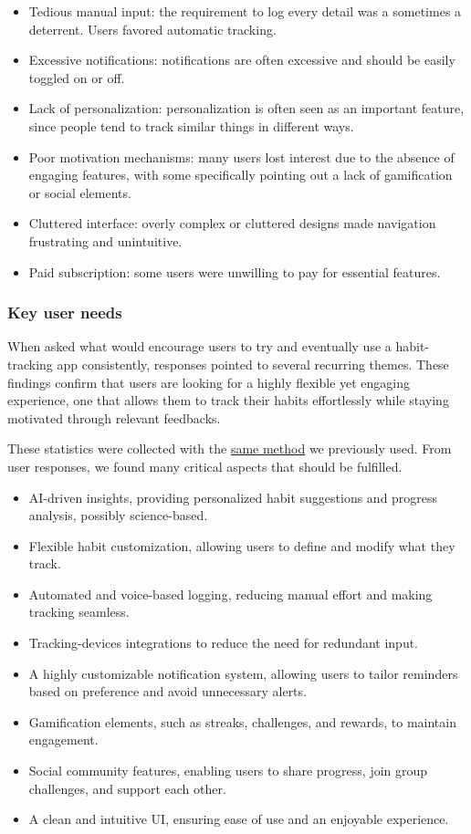 \documentclass{article}
\begin{document}
\begin{itemize}
    \item Tedious manual input: the requirement to log every detail was a sometimes a deterrent. Users favored automatic tracking.
    \item Excessive notifications: notifications are often excessive and should be easily toggled on or off.
    \item Lack of personalization: personalization is often seen as an important feature, since people tend to track similar things in different ways.
    \item Poor motivation mechanisms: many users lost interest due to the absence of engaging features, with some specifically pointing out a lack of gamification or social elements.
    \item Cluttered interface: overly complex or cluttered designs made navigation frustrating and unintuitive.
    \item Paid subscription: some users were unwilling to pay for essential features.
\end{itemize}

\subsubsection{Key user needs}

When asked what would encourage users to try and eventually use a habit-tracking app consistently, responses pointed to several recurring themes.
These findings confirm that users are looking for a highly flexible yet engaging experience, one that allows them to track their habits effortlessly while staying motivated through relevant feedbacks.

These statistics were collected with the \hyperref[parag:stats-method]{same method} we previously used.
From user responses, we found many critical aspects that should be fulfilled.

\begin{itemize}
    \item AI-driven insights, providing personalized habit suggestions and progress analysis, possibly science-based.
    \item Flexible habit customization, allowing users to define and modify what they track.
    \item Automated and voice-based logging, reducing manual effort and making tracking seamless.
    \item Tracking-devices integrations to reduce the need for redundant input.
    \item A highly customizable notification system, allowing users to tailor reminders based on preference and avoid unnecessary alerts.
    \item Gamification elements, such as streaks, challenges, and rewards, to maintain engagement.
    \item Social community features, enabling users to share progress, join group challenges, and support each other.
    \item A clean and intuitive UI, ensuring ease of use and an enjoyable experience.
\end{itemize}
\end{document}
